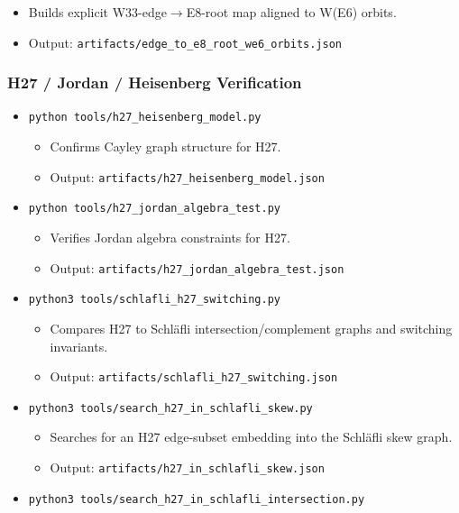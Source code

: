 \documentclass[11pt]{article}
\providecommand{\tightlist}{%
  \setlength{\itemsep}{0pt}\setlength{\parskip}{0pt}}
\begin{document}
\begin{itemize}
  \begin{itemize}
  \tightlist
  \item
    Builds explicit W33-edge\ensuremath{\rightarrow}E8-root map aligned
    to W(E6) orbits.
  \item
    Output: \texttt{artifacts/edge\_to\_e8\_root\_we6\_orbits.json}
  \end{itemize}
\end{itemize}

\subsubsection{H27 / Jordan / Heisenberg
Verification}\label{h27-jordan-heisenberg-verification}

\begin{itemize}
\tightlist
\item
  \texttt{python\ tools/h27\_heisenberg\_model.py}

  \begin{itemize}
  \tightlist
  \item
    Confirms Cayley graph structure for H27.
  \item
    Output: \texttt{artifacts/h27\_heisenberg\_model.json}
  \end{itemize}
\item
  \texttt{python\ tools/h27\_jordan\_algebra\_test.py}

  \begin{itemize}
  \tightlist
  \item
    Verifies Jordan algebra constraints for H27.
  \item
    Output: \texttt{artifacts/h27\_jordan\_algebra\_test.json}
  \end{itemize}
\item
  \texttt{python3\ tools/schlafli\_h27\_switching.py}

  \begin{itemize}
  \tightlist
  \item
    Compares H27 to Schläfli intersection/complement graphs and
    switching invariants.
  \item
    Output: \texttt{artifacts/schlafli\_h27\_switching.json}
  \end{itemize}
\item
  \texttt{python3\ tools/search\_h27\_in\_schlafli\_skew.py}

  \begin{itemize}
  \tightlist
  \item
    Searches for an H27 edge‑subset embedding into the Schläfli skew
    graph.
  \item
    Output: \texttt{artifacts/h27\_in\_schlafli\_skew.json}
  \end{itemize}
\item
  \texttt{python3\ tools/search\_h27\_in\_schlafli\_intersection.py}


\end{itemize}
\end{document}
